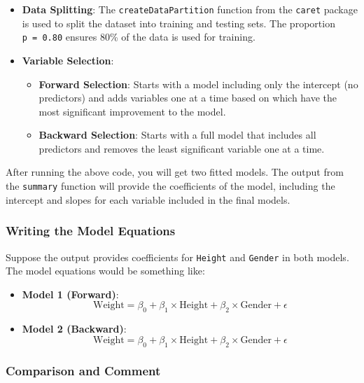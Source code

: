 \documentclass[
]{article}
\providecommand{\tightlist}{%
  \setlength{\itemsep}{0pt}\setlength{\parskip}{0pt}}
\begin{document}
\begin{itemize}
\tightlist
\item
  \textbf{Data Splitting}: The \texttt{createDataPartition} function
  from the \texttt{caret} package is used to split the dataset into
  training and testing sets. The proportion \texttt{p\ =\ 0.80} ensures
  80\% of the data is used for training.
\item
  \textbf{Variable Selection}:

  \begin{itemize}
  \tightlist
  \item
    \textbf{Forward Selection}: Starts with a model including only the
    intercept (no predictors) and adds variables one at a time based on
    which have the most significant improvement to the model.
  \item
    \textbf{Backward Selection}: Starts with a full model that includes
    all predictors and removes the least significant variable one at a
    time.
  \end{itemize}
\end{itemize}

After running the above code, you will get two fitted models. The output
from the \texttt{summary} function will provide the coefficients of the
model, including the intercept and slopes for each variable included in
the final models.

\hypertarget{writing-the-model-equations}{%
\subsubsection{Writing the Model
Equations}\label{writing-the-model-equations}}

Suppose the output provides coefficients for \texttt{Height} and
\texttt{Gender} in both models. The model equations would be something
like:

\begin{itemize}
\tightlist
\item
  \textbf{Model 1 (Forward)}:
  \[ \text{Weight} = \beta_0 + \beta_1 \times \text{Height} + \beta_2 \times \text{Gender} + \epsilon \]
\item
  \textbf{Model 2 (Backward)}:
  \[ \text{Weight} = \beta_0 + \beta_1 \times \text{Height} + \beta_2 \times \text{Gender} + \epsilon \]
\end{itemize}

\hypertarget{comparison-and-comment}{%
\subsubsection{Comparison and Comment}\label{comparison-and-comment}}
\end{document}
